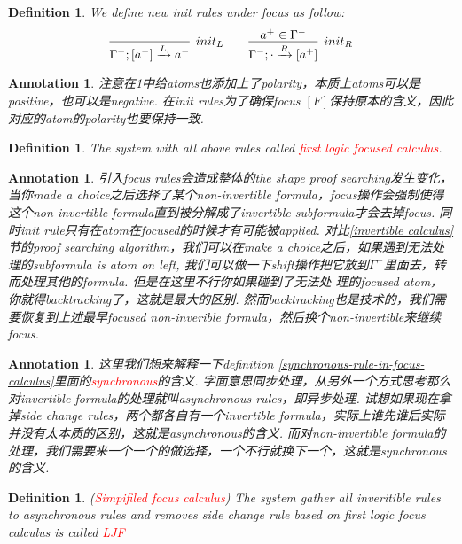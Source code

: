 \documentclass{article}
\theoremstyle{plain}
\newtheorem{definition}[theorem]{Definition}
\newtheorem{annotation}[theorem]{Annotation}
\theoremstyle{nonumberplain}
\newcommand{\redt}[1]{\textcolor{red}{#1}}
\begin{document}
\begin{definition}\label{init-of-invertible-calculus}
\rm We define new \emph{init} rules under focus as follow: 
\[
\infer[init_L]{\Gamma^-;[a^-] \xrightarrow{L} a^-}{} \quad\quad
\infer[init_R]{\Gamma^-; \cdot \xrightarrow{R} [a^+]}{a^+ \in \Gamma^-}
\]
\end{definition}

\begin{annotation}
\rm 注意在\ref{init-of-invertible-calculus}中给atoms也添加上了polarity，本质上atoms可以是positive，也可以是negative. 在\emph{init} rules为了确保focus $[F]$保持原本的含义，因此对应的atom的polarity也要保持一致. 	
\end{annotation}


\begin{definition}
\rm The system with all above rules called \redt{first logic focused calculus}.
\end{definition}


\begin{annotation}
\rm 引入\textsl{focus} rules会造成整体的the shape proof searching发生变化，当你made a choice之后选择了某个non-invertible formula，focus操作会强制使得这个non-invertible formula直到被分解成了invertible subformula才会去掉focus. 同时\emph{init} rule只有在atom在focused的时候才有可能被applied. 对比\ref{invertible calculus}节的proof searching algorithm，我们可以在make a choice之后，如果遇到无法处理的subformula is atom on left, 我们可以做一下\textsl{shift}操作把它放到$\Gamma^-$里面去，转而处理其他的formula. 但是在这里不行你如果碰到了无法处
理的focused atom，你就得backtracking了，这就是最大的区别. 然而backtracking也是技术的，我们需要恢复到上述最早focused non-inverible formula，然后换个non-invertible来继续focus. 
\end{annotation}


\begin{annotation}
\rm 这里我们想来解释一下definition \ref{synchronous-rule-in-focus-calculus}里面的\redt{synchronous}的含义. 字面意思同步处理，从另外一个方式思考那么对invertible formula的处理就叫asynchronous rules，即异步处理. 试想如果现在拿掉side change rules，两个都各自有一个invertible formula，实际上谁先谁后实际并没有太本质的区别，这就是asynchronous的含义. 而对non-invertible formula的处理，我们需要来一个一个的做选择，一个不行就换下一个，这就是synchronous的含义. 
\end{annotation}


\begin{definition}\label{LJF}
\rm (\redt{Simpifiled focus calculus}) The system gather all inveritible rules to asynchronous rules and removes side change rule based on first logic focus calculus is called \redt{LJF}
\end{definition}
\end{document}
